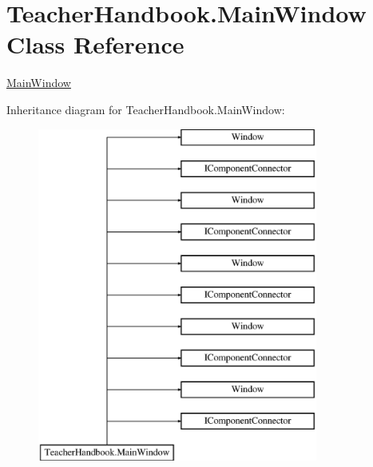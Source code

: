 \hypertarget{class_teacher_handbook_1_1_main_window}{}\section{Teacher\+Handbook.\+Main\+Window Class Reference}
\label{class_teacher_handbook_1_1_main_window}


\mbox{\hyperlink{class_teacher_handbook_1_1_main_window}{Main\+Window}}  


Inheritance diagram for Teacher\+Handbook.\+Main\+Window\+:\begin{figure}[H]
\begin{center}
\leavevmode
\includegraphics[height=11.000000cm]{df/d32/class_teacher_handbook_1_1_main_window}
\end{center}
\end{figure}
